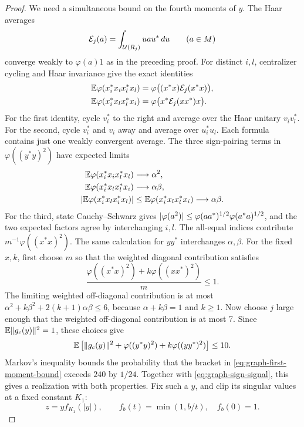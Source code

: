 \begin{proof}
We need a simultaneous bound on the fourth moments of $y$.  The Haar
averages
\[
 \mathcal E_j(a)=\int_{\mathcal U(R_j)}uau^*\,du\qquad(a\in M)
\]
converge weakly to $\varphi(a)1$ as in the preceding proof.  For
distinct $i,l$, centralizer cycling and Haar invariance give the exact
identities
\begin{align*}
 \mathbb E\varphi(x_i^*x_i x_l^*x_l)
   &=\varphi\bigl((x^*x)\mathcal E_j(x^*x)\bigr),\\
 \mathbb E\varphi(x_i^*x_l x_l^*x_i)
   &=\varphi\bigl(x^*\mathcal E_j(xx^*)x\bigr).
\end{align*}
For the first identity, cycle $v_i^*$ to the right and average over
the Haar unitary $v_iv_l^*$.  For the second, cycle $v_i^*$ and $v_i$
away and average over $u_i^*u_l$.  Each formula contains just one
weakly convergent average.  The three sign-pairing terms in
$\varphi((y^*y)^2)$ have expected limits
\begin{align*}
 \mathbb E\varphi(x_i^*x_i x_l^*x_l)&\longrightarrow\alpha^2,\\
 \mathbb E\varphi(x_i^*x_l x_l^*x_i)&\longrightarrow\alpha\beta,\\
 \lvert\mathbb E\varphi(x_i^*x_l x_i^*x_l)\rvert
 &\leq\mathbb E\varphi(x_i^*x_l x_l^*x_i)
 \longrightarrow\alpha\beta.
\end{align*}
For the third, state Cauchy--Schwarz gives
$\lvert\varphi(a^2)\rvert\leq\varphi(aa^*)^{1/2}\varphi(a^*a)^{1/2}$,
and the two expected factors agree by interchanging $i,l$.
The all-equal indices contribute $m^{-1}\varphi((x^*x)^2)$.
The same calculation for $yy^*$ interchanges $\alpha,\beta$.
For the fixed $x,k$, first choose $m$ so that the weighted diagonal
contribution satisfies
\[
 \frac{\varphi((x^*x)^2)+k\varphi((xx^*)^2)}{m}\leq1.
\]
The limiting weighted off-diagonal contribution is at most
$\alpha^2+k\beta^2+2(k+1)\alpha\beta\leq6$, because
$\alpha+k\beta=1$ and $k\geq1$.  Now choose $j$ large enough that
the weighted off-diagonal contribution is at most 7.
Since $\mathbb E\lVert g_c(y)\rVert^2=1$, these choices give
\begin{equation}
 \mathbb E\left[\lVert g_c(y)\rVert^2+
       \varphi((y^*y)^2)+k\varphi((yy^*)^2)\right]\leq10.
 \label{eq:graph-first-moment-bound}
\end{equation}
Markov's inequality bounds the probability that the bracket in
\eqref{eq:graph-first-moment-bound} exceeds $240$ by $1/24$.
Together with \eqref{eq:graph-sign-signal}, this gives a realization
with both properties.  Fix such a $y$, and clip its singular values at
a fixed constant $K_1$:
\[
 z=y f_{K_1}(|y|),\qquad
 f_b(t)=\min(1,b/t),\quad f_b(0)=1.
\]
\end{proof}
